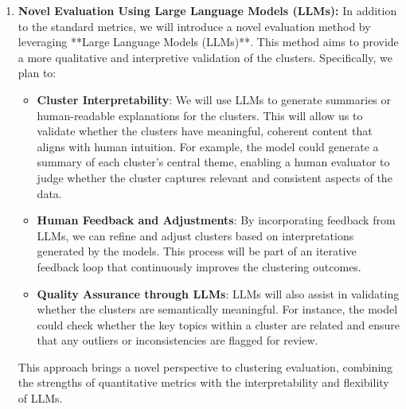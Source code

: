\documentclass[11pt]{article}
\begin{document}
\begin{enumerate}
    \item \textbf{Novel Evaluation Using Large Language Models (LLMs):}  
    In addition to the standard metrics, we will introduce a novel evaluation method by leveraging **Large Language Models (LLMs)**. This method aims to provide a more qualitative and interpretive validation of the clusters. Specifically, we plan to:
    \begin{itemize}
        \item \textbf{Cluster Interpretability}: We will use LLMs to generate summaries or human-readable explanations for the clusters. This will allow us to validate whether the clusters have meaningful, coherent content that aligns with human intuition. For example, the model could generate a summary of each cluster's central theme, enabling a human evaluator to judge whether the cluster captures relevant and consistent aspects of the data.
        \item \textbf{Human Feedback and Adjustments}: By incorporating feedback from LLMs, we can refine and adjust clusters based on interpretations generated by the models. This process will be part of an iterative feedback loop that continuously improves the clustering outcomes.
        \item \textbf{Quality Assurance through LLMs}: LLMs will also assist in validating whether the clusters are semantically meaningful. For instance, the model could check whether the key topics within a cluster are related and ensure that any outliers or inconsistencies are flagged for review.
    \end{itemize}
    This approach brings a novel perspective to clustering evaluation, combining the strengths of quantitative metrics with the interpretability and flexibility of LLMs.

\end{enumerate}

%
%
\newpage


\end{document}
